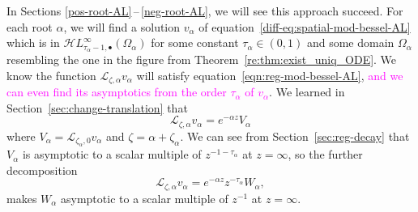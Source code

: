 \documentclass{article}
\newcommand{\singexp}[2]{\mathcal{H}L^\infty_{#1, #2}}
\newcommand{\singexpalg}[1]{\singexp{#1}{\bullet}}
\newcommand{\fracderiv}[3]{\partial^{#1}_{#2, #3}}
\newcommand{\laplace}{\mathcal{L}}
\theoremstyle{definition}
\theoremstyle{plain}
\begin{document}
In Sections \ref{pos-root-AL}\,--\,\ref{neg-root-AL}, we will see this approach succeed. For each root $\alpha$, we will find a solution $v_\alpha$ of equation~\eqref{diff-eq:spatial-mod-bessel-AL} which is in $\singexpalg{\tau_\alpha-1}(\Omega_\alpha)$ for some constant $\tau_\alpha \in (0, 1)$ and some domain $\Omega_\alpha$ resembling the one in the figure from Theorem~\ref{re:thm:exist_uniq_ODE}. We know the function $\laplace_{\zeta, \alpha} v_\alpha$ will satisfy equation~\eqref{eqn:reg-mod-bessel-AL}, \textcolor{magenta}{and we can even find its asymptotics from the order $\tau_\alpha$ of $v_\alpha$}. We learned in Section~\ref{sec:change-translation} that
\[ \laplace_{\zeta, \alpha} v_\alpha = e^{-\alpha z} V_\alpha \]
where $V_\alpha = \laplace_{\zeta_\alpha, 0} v_\alpha$ and $\zeta = \alpha + \zeta_\alpha$. We can see from Section~\ref{sec:reg-decay} that $V_\alpha$ is asymptotic to a scalar multiple of $z^{-1 - \tau_\alpha}$ at $z = \infty$, so the further decomposition
\[ \laplace_{\zeta, \alpha} v_\alpha = e^{-\alpha z} z^{-\tau_\alpha} W_\alpha, \]
makes $W_\alpha$ asymptotic to a scalar multiple of $z^{-1}$ at $z = \infty$.
\end{document}
